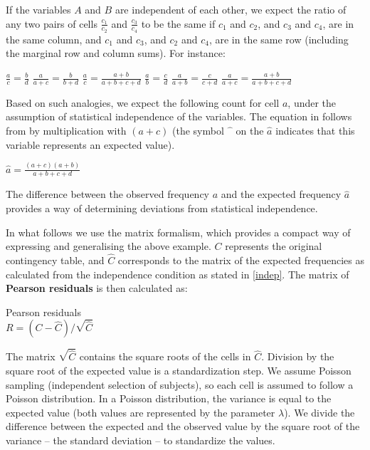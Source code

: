\begin{paperappendix}
If the variables $A$ and $B$ are independent of each other, we expect
the ratio of any two pairs of cells $\frac{c_1}{c_2}$ and
$\frac{c_3}{c_4}$ to be the same if $c_1$ and $c_2$, and $c_3$ and
$c_4$, are in the same column, and $c_1$ and $c_3$, and $c_2$ and
$c_4$, are in the same row (including the marginal row and column
sums). For instance:

\begin{exe}
  \ex
  \begin{xlist}
    \ex $\frac{a}{c}=\frac{b}{d}$
    \ex $\frac{a}{a+c}=\frac{b}{b+d}$
    \ex $\frac{a}{c}=\frac{a+b}{a+b+c+d}$
    \ex $\frac{a}{b}=\frac{c}{d}$
    \ex $\frac{a}{a+b}=\frac{c}{c+d}$
    \ex\label{abcd} $\frac{a}{a+c}=\frac{a+b}{a+b+c+d}$
  \end{xlist}
\end{exe}
%
Based on such analogies, we expect the following count for cell $a$,
under the assumption of statistical independence of the variables. The
equation in  follows from  by multiplication with
$(a+c)$ (the symbol $\hat{\phantom{a}}$ on the $\hat{a}$ indicates that this variable
represents an expected value).

\begin{exe}
      \ex\label{ahat} $\hat{a}=\frac{(a+c)(a+b)}{a+b+c+d}$   
\end{exe}
%
The difference between the observed frequency $a$ and the expected
frequency $\hat{a}$ provides a way of determining
deviations from statistical independence.

In what follows we use the matrix formalism, which provides a compact
way of expressing and generalising the above example. $C$ represents
the original contingency table, and $\hat{C}$ corresponds to the
matrix of the expected frequencies as calculated from the independence
condition as stated in \ref{indep}.
%
The matrix of \textbf{Pearson residuals} is then calculated as:

\begin{exe}
  \ex Pearson residuals\\$R=(C-\hat{C})/\sqrt{\hat{C}}$
\end{exe}
%
The matrix
$\sqrt{\hat{C}}$ contains the square roots of the cells in
$\hat{C}$. Division by the square root of the expected value is a
standardization step. We assume Poisson sampling (independent
selection of subjects), so each cell is assumed to follow a Poisson
distribution. In a Poisson distribution, the variance is equal to the
expected value (both values are represented by the parameter
$\lambda$). We divide the difference between the expected and the
observed value by the square root of the variance -- the standard
deviation -- to standardize the values.


\end{paperappendix}
